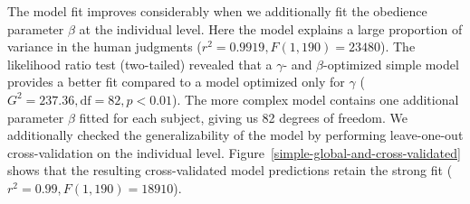\documentclass[11pt,a4paper]{article}
\begin{document}

 

The model fit improves considerably when we additionally fit the obedience parameter $\beta$ at the individual level. 
Here the model explains a large proportion of variance in the human judgments ($r^2 = 0.9919, F(1,190) = 23480$). The likelihood ratio test (two-tailed) revealed that a $\gamma$- and $\beta$-optimized simple model provides a better fit compared to a model optimized only for $\gamma$ ($G^2 = 237.36, \textrm{df} = 82, p < 0.01$). The more complex model contains one additional parameter $\beta$ fitted for each subject, giving us 82 degrees of freedom. We additionally checked the generalizability of the model by performing leave-one-out cross-validation on the individual level. Figure~\ref{simple-global-and-cross-validated} shows that the resulting cross-validated model predictions retain the strong fit ($r^2 = 0.99, F(1,190) = 18910$).

\end{document}
